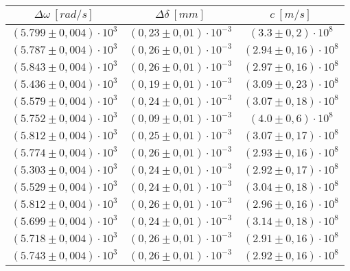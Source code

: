 \begin{table}[H]
    \centering
        \begin{tabular}{|c|c|c|}
        \hline
        $ \Delta\omega~[rad/s] $ & $ \Delta\delta~[mm] $ & $ c~[m/s] $\\
        \hline
        $ (5.799 \pm 0,004) \cdot 10^{3} $ & $ (0,23 \pm 0,01) \cdot 10^{-3} $ & $ (3.3 \pm 0,2) \cdot 10^{8} $\\
        \hline
        $ (5.787 \pm 0,004) \cdot 10^{3} $ & $ (0,26 \pm 0,01) \cdot 10^{-3} $ & $ (2.94 \pm 0,16) \cdot 10^{8} $\\
        \hline
        $ (5.843 \pm 0,004) \cdot 10^{3} $ & $ (0,26 \pm 0,01) \cdot 10^{-3} $ & $ (2.97 \pm 0,16) \cdot 10^{8} $\\
        \hline
        $ (5.436 \pm 0,004) \cdot 10^{3} $ & $ (0,19 \pm 0,01) \cdot 10^{-3} $ & $ (3.09 \pm 0,23) \cdot 10^{8} $\\
        \hline
        $ (5.579 \pm 0,004) \cdot 10^{3} $ & $ (0,24 \pm 0,01) \cdot 10^{-3} $ & $ (3.07 \pm 0,18) \cdot 10^{8} $\\
        \hline
        $ (5.752 \pm 0,004) \cdot 10^{3} $ & $ (0,09 \pm 0,01) \cdot 10^{-3} $ & $ (4.0 \pm 0,6) \cdot 10^{8} $\\
        \hline
        $ (5.812 \pm 0,004) \cdot 10^{3} $ & $ (0,25 \pm 0,01) \cdot 10^{-3} $ & $ (3.07 \pm 0,17) \cdot 10^{8} $\\
        \hline
        $ (5.774 \pm 0,004) \cdot 10^{3} $ & $ (0,26 \pm 0,01) \cdot 10^{-3} $ & $ (2.93 \pm 0,16) \cdot 10^{8} $\\
        \hline
        $ (5.303 \pm 0,004) \cdot 10^{3} $ & $ (0,24 \pm 0,01) \cdot 10^{-3} $ & $ (2.92 \pm 0,17) \cdot 10^{8} $\\
        \hline
        $ (5.529 \pm 0,004) \cdot 10^{3} $ & $ (0,24 \pm 0,01) \cdot 10^{-3} $ & $ (3.04 \pm 0,18) \cdot 10^{8} $\\
        \hline
        $ (5.812 \pm 0,004) \cdot 10^{3} $ & $ (0,26 \pm 0,01) \cdot 10^{-3} $ & $ (2.96 \pm 0,16) \cdot 10^{8} $\\
        \hline
        $ (5.699 \pm 0,004) \cdot 10^{3} $ & $ (0,24 \pm 0,01) \cdot 10^{-3} $ & $ (3.14 \pm 0,18) \cdot 10^{8} $\\
        \hline
        $ (5.718 \pm 0,004) \cdot 10^{3} $ & $ (0,26 \pm 0,01) \cdot 10^{-3} $ & $ (2.91 \pm 0,16) \cdot 10^{8} $\\
        \hline
        $ (5.743 \pm 0,004) \cdot 10^{3} $ & $ (0,26 \pm 0,01) \cdot 10^{-3} $ & $ (2.92 \pm 0,16) \cdot 10^{8} $\\

\end{tabular}
\end{table}
